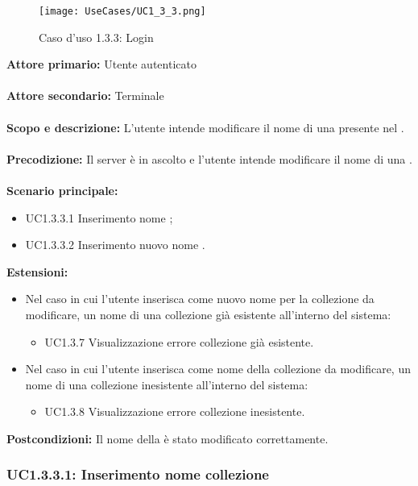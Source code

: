 \documentclass{scalatekids-article}
\begin{document}
\begin{figure}[H]
  \begin{center}
    \texttt{[image: UseCases/UC1\_3\_3.png]}
    \caption*{Caso d'uso 1.3.3: Login}
  \end{center}
\end{figure}
\textbf{Attore primario:} Utente autenticato\\ \\
\textbf{Attore secondario:} Terminale\\ \\
\textbf{Scopo e descrizione:} L’utente intende modificare il nome di una  presente nel .\\ \\
\textbf{Precodizione:} Il server è in ascolto e l’utente intende modificare il nome di una .\\ \\
\textbf{Scenario principale:}
\begin{itemize}
\item UC1.3.3.1 Inserimento nome ;
\item UC1.3.3.2 Inserimento nuovo nome .
\end{itemize}
\textbf{Estensioni:}
\begin{itemize}
\item Nel caso in cui l'utente inserisca come nuovo nome per la collezione da modificare, un nome di una collezione già esistente all'interno del sistema:
  \begin{itemize}
  \item UC1.3.7 Visualizzazione errore collezione già esistente.
  \end{itemize}
\item Nel caso in cui l'utente inserisca come nome della collezione da modificare, un nome di una collezione inesistente all'interno del sistema:
  \begin{itemize}
  \item UC1.3.8 Visualizzazione errore collezione inesistente.
  \end{itemize}
\end{itemize}
\textbf{Postcondizioni:} Il nome della  è stato modificato correttamente.

\subsubsection{UC1.3.3.1: Inserimento nome collezione}
\end{document}
